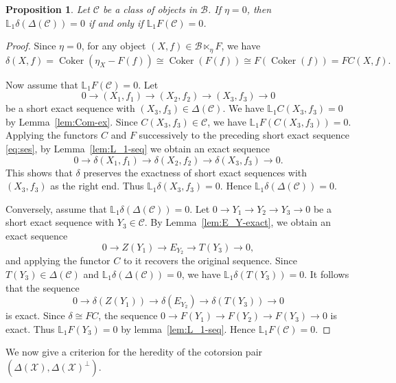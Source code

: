 \documentclass[11pt,reqno]{amsart}
\numberwithin{equation}{section}
\newtheorem{proposition}[theorem]{Proposition}
\newcommand{\cB}{\mathcal B}
\newcommand{\cX}{\mathcal X}
\newcommand{\cC}{\mathcal C}
\newcommand{\Coker}{\operatorname{Coker}}
\begin{document}
\begin{proposition}
Let $\cC$ be a class of objects in $\cB$. If $\eta=0$, then $\mathbb{L}_1\delta(\Delta(\cC))=0$ if and only if $\mathbb{L}_1F(\cC)=0$.
\end{proposition}
\begin{proof}
Since $\eta=0$, for any object $(X,f)\in \cB\ltimes_\eta F$, we have
\[
\delta(X,f)=\Coker(\eta_X-F(f))\cong \Coker(F(f))\cong F(\Coker(f))=FC(X,f).
\]

Now assume that $\mathbb{L}_1F(\cC)=0$. Let
\begin{equation}\label{eq:ses}
0\rightarrow (X_1,f_1)\rightarrow (X_2,f_2)\rightarrow (X_3,f_3)\rightarrow 0
\end{equation}
be a short exact sequence
with $(X_3,f_3)\in \Delta(\cC)$. We have $\mathbb{L}_1C(X_3,f_3)=0$ by Lemma~\ref{lem:Com-ex}. Since $C(X_3,f_3)\in \cC$, we have $\mathbb{L}_1F(C(X_3,f_3))=0$. Applying the functors
$C$ and $F$ successively to the preceding short exact sequence \eqref{eq:ses}, by Lemma~\ref{lem:L_1-seq} we obtain an exact sequence
\[
0\rightarrow \delta(X_1,f_1)\rightarrow \delta(X_2,f_2)\rightarrow \delta(X_3,f_3)\rightarrow 0.
\]
This shows that $\delta$ preserves the exactness of short exact sequences with $(X_3,f_3)$ as the right end. Thus $\mathbb{L}_1\delta(X_3,f_3)=0$. Hence
$\mathbb{L}_1\delta(\Delta(\cC))=0$.

Conversely, assume that $\mathbb{L}_1\delta(\Delta(\cC))=0$. Let $0\to Y_1 \to Y_2 \to Y_3 \to 0$ be a short exact sequence with $Y_3\in \cC$. By Lemma~\ref{lem:E_Y-exact},
we obtain an exact sequence
\[
0\to Z(Y_1)\to E_{Y_2} \to T(Y_3) \to 0,
\]
and applying the functor $C$ to it recovers the original sequence.
Since $T(Y_3)\in \Delta(\cC)$ and $\mathbb{L}_1\delta(\Delta(\cC))=0$, we have $\mathbb{L}_1\delta(T(Y_3))=0$. It follows that the sequence
\[
0\to \delta(Z(Y_1))\to \delta(E_{Y_2}) \to \delta(T(Y_3))\to 0
\]
is exact. Since $\delta\cong FC$, the sequence $0\to F(Y_1)\to F(Y_2)\to F(Y_3)\to 0$ is exact. Thus $\mathbb{L}_1F(Y_3)=0$ by lemma~\ref{lem:L_1-seq}. Hence $\mathbb{L}_1F(\cC)=0.$
\end{proof}

We now give a criterion for the heredity of the cotorsion pair $(\Delta(\cX),\Delta(\cX)^\perp)$.
\end{document}
